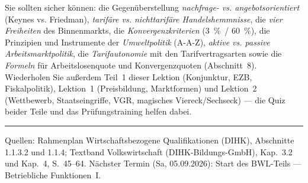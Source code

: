 \documentclass[11pt, a4paper]{article}
\begin{document}
\begin{merksatz}[title={\bfseries Wichtig für die Prüfungsvorbereitung (Block 1.1 komplett)}]
Sie sollten sicher können: die Gegenüberstellung \emph{nachfrage- vs. angebotsorientiert}
(Keynes vs. Friedman), \emph{tarifäre vs. nichttarifäre Handelshemmnisse}, die \emph{vier
Freiheiten} des Binnenmarkts, die \emph{Konvergenzkriterien} (3~\%~/ 60~\%), die
Prinzipien und Instrumente der \emph{Umweltpolitik} (A-A-Z), \emph{aktive vs. passive
Arbeitsmarktpolitik}, die \emph{Tarifautonomie} mit den Tarifvertragsarten sowie die
\emph{Formeln} für Arbeitslosenquote und Konvergenzquoten (Abschnitt~8). Wiederholen Sie
außerdem Teil~1 dieser Lektion (Konjunktur, EZB, Fiskalpolitik),
Lektion~1 (Preisbildung, Marktformen) und Lektion~2 (Wettbewerb, Staatseingriffe, VGR,
magisches Viereck/Sechseck) --- die Quiz beider Teile und das Prüfungstraining helfen dabei.
\end{merksatz}

\vspace{1em}
\hrule
\vspace{0.8em}
\noindent\textsf{\small Quellen: Rahmenplan Wirtschaftsbezogene Qualifikationen (DIHK), Abschnitte 1.1.3.2 und 1.1.4;
Textband Volkswirtschaft (DIHK-Bildungs-GmbH), Kap.~3.2 und Kap.~4, S.~45--64. Nächster Termin (Sa, 05.09.2026):
Start des BWL-Teils --- Betriebliche Funktionen~I.}
\end{document}
